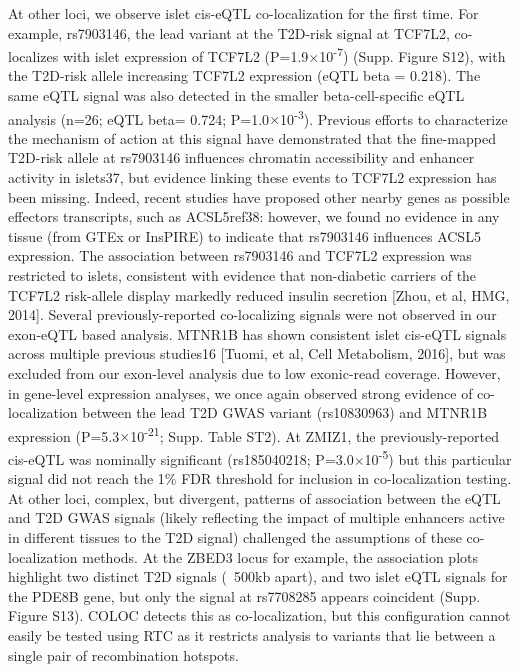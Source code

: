 At other loci, we observe islet cis-eQTL co-localization for the first time. For example, rs7903146, the lead variant at the T2D-risk signal at TCF7L2, co-localizes with islet expression of TCF7L2 (P=1.9$\times$10\textsuperscript{-7}) (Supp. Figure S12), with the T2D-risk allele increasing TCF7L2 expression (eQTL beta = 0.218). The same eQTL signal was also detected in the smaller beta-cell-specific eQTL analysis (n=26; eQTL beta= 0.724; P=1.0$\times$10\textsuperscript{-3}). Previous efforts to characterize the mechanism of action at this signal have demonstrated that the fine-mapped T2D-risk allele at rs7903146 influences chromatin accessibility and enhancer activity in islets37, but evidence linking these events to TCF7L2 expression has been missing. Indeed, recent studies have proposed other nearby genes as possible effectors transcripts, such as ACSL5ref38: however, we found no evidence in any tissue (from GTEx or InsPIRE) to indicate that rs7903146 influences ACSL5 expression. The association between rs7903146 and TCF7L2 expression was restricted to islets, consistent with evidence that non-diabetic carriers of the TCF7L2 risk-allele display markedly reduced insulin secretion [Zhou, et al, HMG, 2014].
Several previously-reported co-localizing signals were not observed in our exon-eQTL based analysis. MTNR1B has shown consistent islet cis-eQTL signals across multiple previous studies16 [Tuomi, et al, Cell Metabolism, 2016], but was excluded from our exon-level analysis due to low exonic-read coverage. However, in gene-level expression analyses, we once again observed strong evidence of co-localization between the lead T2D GWAS variant (rs10830963) and MTNR1B expression (P=5.3$\times$10\textsuperscript{-21}; Supp. Table ST2). At ZMIZ1, the previously-reported cis-eQTL was nominally significant (rs185040218; P=3.0$\times$10\textsuperscript{-5}) but this particular signal did not reach the 1\% FDR threshold for inclusion in co-localization testing. 
At other loci, complex, but divergent, patterns of association between the eQTL and T2D GWAS signals (likely reflecting the impact of multiple enhancers active in different tissues to the T2D signal) challenged the assumptions of these co-localization methods. At the ZBED3 locus for example, the association plots highlight two distinct T2D signals (~500kb apart), and two islet eQTL signals for the PDE8B gene, but only the signal at rs7708285 appears coincident (Supp. Figure S13). COLOC detects this as co-localization, but this configuration cannot easily be tested using RTC as it restricts analysis to variants that lie between a single pair of recombination hotspots. 
